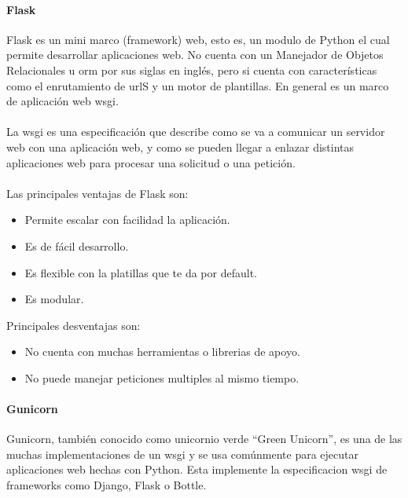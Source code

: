 \documentclass[12pt, a4paper, titlepage]{report}
\begin{document}
			\paragraph{Flask \\}
			Flask es un mini marco (framework) web, esto es, un modulo de Python el cual permite desarrollar aplicaciones web. No cuenta con un Manejador de Objetos Relacionales u \acrshort{orm} por sus siglas en inglés, pero si cuenta con características como el enrutamiento de \acrshort{url}S y un motor de plantillas. En general es un marco de aplicación web \acrshort{wsgi}.\\\\
			La \acrfull{wsgi} es una especificación que describe como se va a comunicar un servidor web con una aplicación web, y como se pueden llegar a enlazar distintas aplicaciones web para procesar una solicitud o una petición.\\\\
			Las principales ventajas de Flask son: 
			\begin{itemize}
				\item Permite escalar con facilidad la aplicación.
				\item Es de fácil desarrollo.
				\item Es flexible con la platillas que te da por default.
				\item Es modular.
			\end{itemize}
			
			Principales desventajas son: 
			\begin{itemize}
				\item No cuenta con muchas herramientas o librerias de apoyo.
				\item No puede manejar peticiones multiples al mismo tiempo.
			\end{itemize}
		
			\paragraph{Gunicorn \\}
			
			Gunicorn, también conocido como unicornio verde “Green Unicorn”, es una de las muchas implementaciones de un \acrfull{wsgi} y se usa comúnmente para ejecutar aplicaciones web hechas con Python. Esta implemente la especificacion \acrshort{wsgi} de frameworks como Django, Flask o Bottle.
			
\end{document}
